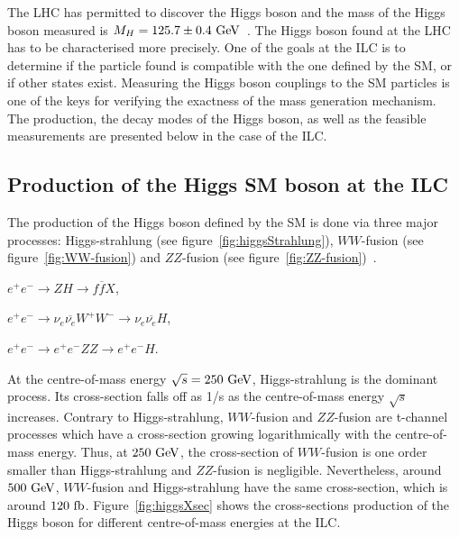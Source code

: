   The \gls{LHC} has permitted to discover the Higgs boson and the mass of the Higgs boson measured is $M_{H} = 125.7 \pm 0.4 ~\rm{GeV}$~\cite{Agashe:2014kda}.
  The Higgs boson found at the \gls{LHC} has to be characterised more precisely.
  One of the goals at the \gls{ILC} is to determine if the particle found is compatible with the one defined by the \gls{SM}, or if other states exist.
  Measuring the Higgs boson couplings to the \gls{SM} particles is one of the keys for verifying the exactness of the mass generation mechanism.
  The production, the decay modes of the Higgs boson, as well as the feasible measurements are presented below in the case of the \gls{ILC}.

    \subsection{Production of the Higgs SM boson at the ILC}

    The production of the Higgs boson defined by the \gls{SM} is done via three major processes: Higgs-strahlung (see figure~\ref{fig:higgsStrahlung}), $WW$-fusion (see figure~\ref{fig:WW-fusion}) and $ZZ$-fusion (see figure~\ref{fig:ZZ-fusion})~\cite{Asner2013}.

    \begin{description}
      \centering
      \item[Higgs-strahlung:] $e^+e^- \rightarrow ZH \rightarrow f\overline{f}X$,
      \item[$WW$-fusion:] $e^+e^- \rightarrow \nu_{e} \overline{\nu_{e}} W^+W^- \rightarrow \nu_{e} \overline{\nu_{e}} H$,
      \item[$ZZ$-fusion:] $e^+e^- \rightarrow e^+e^- ZZ \rightarrow e^+e^- H$.
    \end{description}

    At the centre-of-mass energy $\sqrt{s} = 250~\rm{GeV}$, Higgs-strahlung is the dominant process. 
    Its cross-section falls off as 1/s as the centre-of-mass energy $\sqrt{s}$ increases.
    Contrary to Higgs-strahlung, $WW$-fusion and $ZZ$-fusion are t-channel processes which have a cross-section growing logarithmically with the centre-of-mass energy.
    Thus, at $250~\rm{GeV}$, the cross-section of $WW$-fusion is one order smaller than Higgs-strahlung and $ZZ$-fusion is negligible.
    Nevertheless, around $500~\rm{GeV}$, $WW$-fusion and Higgs-strahlung have the same cross-section, which is around $120~\rm{fb}$.
    Figure~\ref{fig:higgsXsec} shows the cross-sections production of the Higgs boson for different centre-of-mass energies at the \gls{ILC}.
    
